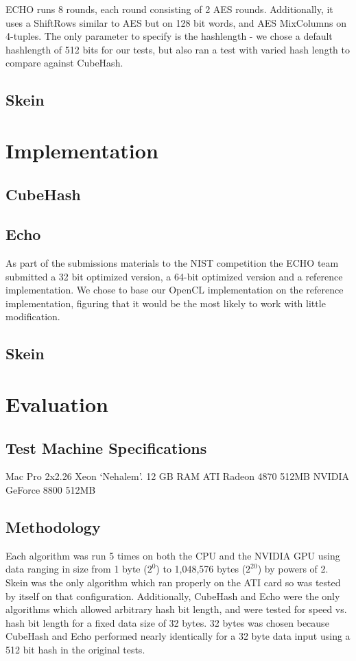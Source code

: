 \documentclass{article}
\begin{document}
ECHO runs 8 rounds, each round consisting of 2 AES rounds.  Additionally, it uses a ShiftRows similar to AES but on 128 bit words, and AES MixColumns on 4-tuples. The only parameter to specify is the hashlength - we chose a default hashlength of 512 bits for our tests, but also ran a test with varied hash length to compare against CubeHash.

\subsection*{Skein}



\section*{Implementation}

\subsection*{CubeHash}

\subsection*{Echo}

As part of the submissions materials to the NIST competition the ECHO team submitted a 32 bit optimized version, a 64-bit optimized version and a reference implementation.  
We chose to base our OpenCL implementation on the reference implementation, figuring that it would be the most likely to work with little modification.

\subsection*{Skein}


\section*{Evaluation}

\subsection*{Test Machine Specifications}
Mac Pro 2x2.26 Xeon `Nehalem'.
12 GB RAM
ATI Radeon 4870 512MB
NVIDIA GeForce 8800 512MB

\subsection*{Methodology}
Each algorithm was run 5 times on both the CPU and the NVIDIA GPU using data ranging in size from 1 byte ($2^0$) to 1,048,576 bytes ($2^{20}$) by powers of 2.
Skein was the only algorithm which ran properly on the ATI card so was tested by itself on that configuration.
Additionally, CubeHash and Echo were the only algorithms which allowed arbitrary hash bit length, and were tested for speed vs. hash bit length for a fixed data size of 32 bytes.
32 bytes was chosen because CubeHash and Echo performed nearly identically for a 32 byte data input using a 512 bit hash in the original tests.
\end{document}
